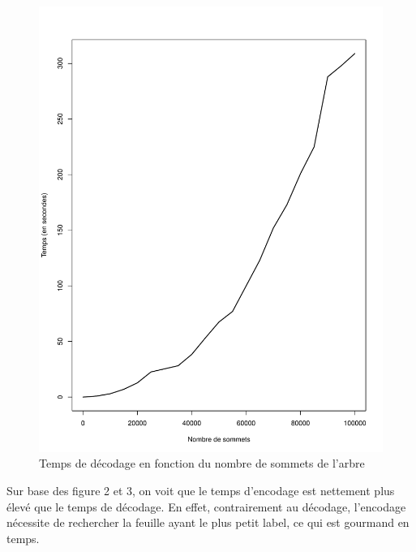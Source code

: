 \documentclass[a4paper, 11pt, oneside]{article}
\begin{document}
\begin{figure}[H]
	\centering
	\includegraphics[scale=0.5]{temps_decodage.pdf} 
	\caption{Temps de décodage en fonction du nombre de sommets de l'arbre}
\end{figure}

Sur base des figure 2 et 3, on voit que le temps d'encodage est nettement plus élevé que le temps de décodage. En effet, contrairement au décodage, l'encodage nécessite de rechercher la feuille ayant le plus petit label, ce qui est gourmand en temps.
\end{document}
